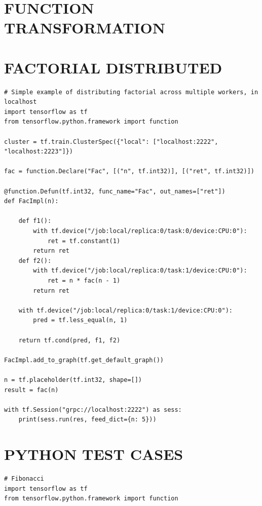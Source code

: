 \documentclass[ack,preface]{dithesis}
\begin{document}
\begin{appendix}
\appendixstartedtrue

{}


\chapter{FUNCTION TRANSFORMATION}

\chapter{FACTORIAL DISTRIBUTED}

\begin{lstlisting}
# Simple example of distributing factorial across multiple workers, in localhost
import tensorflow as tf
from tensorflow.python.framework import function

cluster = tf.train.ClusterSpec({"local": ["localhost:2222", "localhost:2223"]})

fac = function.Declare("Fac", [("n", tf.int32)], [("ret", tf.int32)])

@function.Defun(tf.int32, func_name="Fac", out_names=["ret"])
def FacImpl(n):

	def f1(): 
		with tf.device("/job:local/replica:0/task:0/device:CPU:0"):
			ret = tf.constant(1)
		return ret
	def f2(): 
		with tf.device("/job:local/replica:0/task:1/device:CPU:0"):
			ret = n * fac(n - 1)
		return ret

	with tf.device("/job:local/replica:0/task:1/device:CPU:0"):
		pred = tf.less_equal(n, 1)

	return tf.cond(pred, f1, f2)

FacImpl.add_to_graph(tf.get_default_graph())

n = tf.placeholder(tf.int32, shape=[])
result = fac(n)

with tf.Session("grpc://localhost:2222") as sess:
	print(sess.run(res, feed_dict={n: 5}))

\end{lstlisting}
\chapter{PYTHON TEST CASES}

\begin{lstlisting}
# Fibonacci
import tensorflow as tf
from tensorflow.python.framework import function


\end{lstlisting}
\end{appendix}
\end{document}
